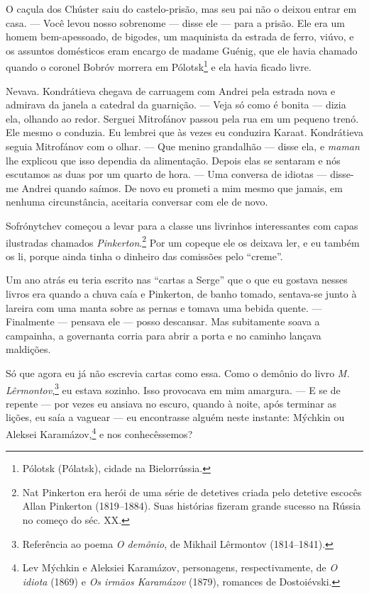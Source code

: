 O caçula dos Chúster saiu do castelo-prisão, mas seu pai não o deixou
entrar em casa. --- Você levou nosso sobrenome --- disse ele --- para a
prisão. Ele era um homem bem-apessoado, de bigodes, um maquinista da
estrada de ferro, viúvo, e os assuntos domésticos eram encargo de madame
Guénig, que ele havia chamado quando o coronel Bobróv morrera em
Pólotsk\footnote{Pólotsk (Pólatsk), cidade na Bielorrússia.} e ela havia
ficado livre.

Nevava. Kondrátieva chegava de carruagem com Andrei pela estrada nova e
admirava da janela a catedral da guarnição. --- Veja só como é bonita
--- dizia ela, olhando ao redor. Serguei Mitrofánov passou pela rua em
um pequeno trenó. Ele mesmo o conduzia. Eu lembrei que às vezes eu
conduzira Karaat. Kondrátieva seguia Mitrofánov com o olhar. --- Que
menino grandalhão --- disse ela, e \emph{maman} lhe explicou que isso
dependia da alimentação. Depois elas se sentaram e nós escutamos as duas
por um quarto de hora. --- Uma conversa de idiotas --- disse-me Andrei
quando saímos. De novo eu prometi a mim mesmo que jamais, em nenhuma
circunstância, aceitaria conversar com ele de novo.

Sofrónytchev começou a levar para a classe uns livrinhos interessantes
com capas ilustradas chamados \emph{Pinkerton}.\footnote{Nat Pinkerton
  era herói de uma série de detetives criada pelo detetive escocês Allan
  Pinkerton (1819--1884). Suas histórias fizeram grande sucesso na
  Rússia no começo do séc. XX.} Por um copeque ele os deixava ler, e eu
também os li, porque ainda tinha o dinheiro das comissões pelo
``creme''.

Um ano atrás eu teria escrito nas ``cartas a Serge'' que o que eu
gostava nesses livros era quando a chuva caía e Pinkerton, de banho
tomado, sentava-se junto à lareira com uma manta sobre as pernas e
tomava uma bebida quente. --- Finalmente --- pensava ele --- posso
descansar. Mas subitamente soava a campainha, a governanta corria para
abrir a porta e no caminho lançava maldições.

Só que agora eu já não escrevia cartas como essa. Como o demônio do
livro \emph{M. Lêrmontov},\footnote{Referência ao poema \emph{O
  demônio}, de Mikhail Lêrmontov (1814--1841).} eu estava sozinho. Isso
provocava em mim amargura. --- E se de repente --- por vezes eu ansiava
no escuro, quando à noite, após terminar as lições, eu saía a vaguear
--- eu encontrasse alguém neste instante: Mýchkin ou Aleksei
Karamázov,\footnote{Lev Mýchkin e Aleksiei Karamázov, personagens,
  respectivamente, de \emph{O idiota} (1869) e \emph{Os irmãos
  Karamázov} (1879), romances de Dostoiévski.} e nos
conhecêssemos?


